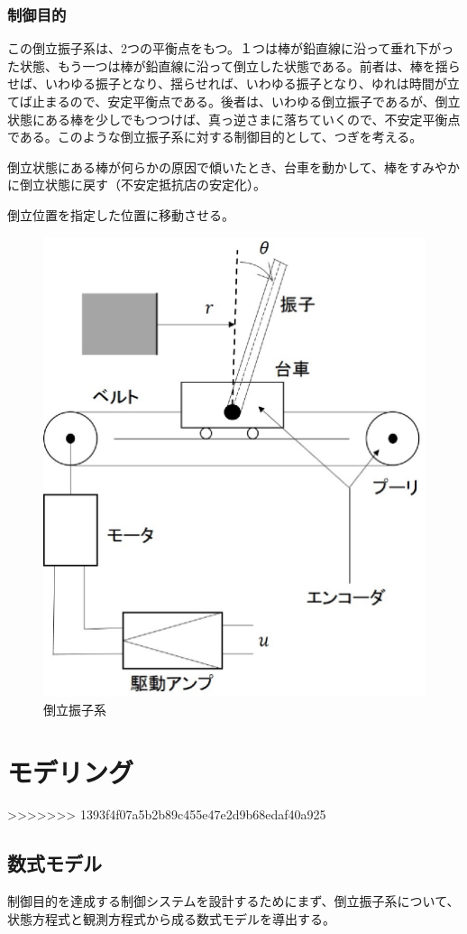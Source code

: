 \documentclass[a4j,11pt,twoside]{ujbook}
\begin{document}
		\subsection{制御目的}
			この倒立振子系は、2つの平衡点をもつ。１つは棒が鉛直線に沿って垂れ下がった状態、もう一つは棒が鉛直線に沿って倒立した状態である。前者は、棒を揺らせば、いわゆる振子となり、揺らせれば、いわゆる振子となり、ゆれは時間が立てば止まるので、安定平衡点である。後者は、いわゆる倒立振子であるが、倒立状態にある棒を少しでもつつけば、真っ逆さまに落ちていくので、不安定平衡点である。このような倒立振子系に対する制御目的として、つぎを考える。
			\begin{description}
			\setlength{\itemindent}{0pt}
			\item[1゜]倒立状態にある棒が何らかの原因で傾いたとき、台車を動かして、棒をすみやかに倒立状態に戻す（不安定抵抗店の安定化）。
			\item[2゜]倒立位置を指定した位置に移動させる。
			\end{description}
			\begin{figure}[htbp]
				\begin{center}
					\includegraphics[width = 0.6 \linewidth]{pendulum.eps}
					\caption{倒立振子系}
					\label{fig:倒立振子系}
				\end{center}
			\end{figure}

\chapter{モデリング}
>>>>>>> 1393f4f07a5b2b89c455e47e2d9b68edaf40a925
	\section{数式モデル}
		制御目的を達成する制御システムを設計するためにまず、倒立振子系について、状態方程式と観測方程式から成る数式モデルを導出する。
\end{document}
